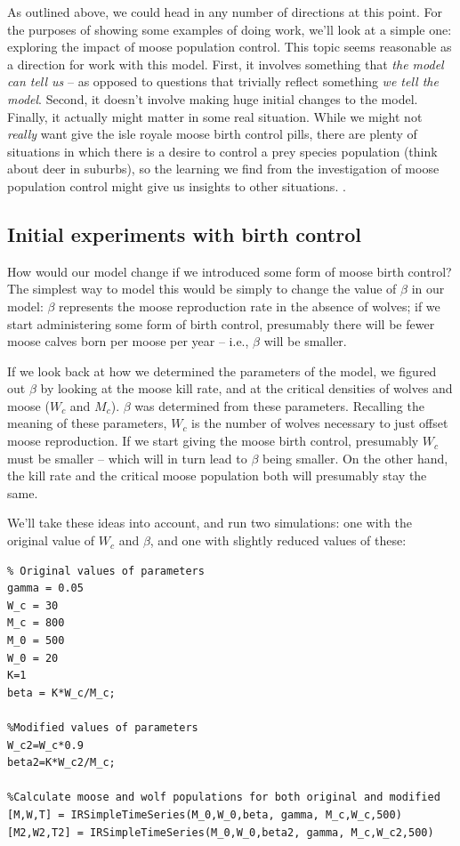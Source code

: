 As outlined above, we could head in any number of directions at this point.  For the purposes of showing some examples of doing work, we'll look at a simple one: exploring the impact of moose population control.
This topic seems reasonable as a direction for work with this model.  First, it  involves something that {\it the model can tell us} -- as opposed to questions that trivially reflect something {\it we tell the model}.  Second, it doesn't involve making huge initial changes to the model.  Finally, it actually might matter in some real situation.  While we might not {\it really} want give the isle royale moose birth control pills, there are plenty of situations in which there is a desire to control a prey species population (think about deer in suburbs), so the learning we find from the investigation of moose population control might give us insights to other situations.  .

\subsection{Initial experiments with birth control}

How would our model change if we introduced some form of moose birth control?  The simplest way to model this would be simply to change the value of $\beta$ in our model:  $\beta$ represents the moose reproduction rate in the absence of wolves; if we start administering some form of birth control, presumably there will be fewer moose calves born per moose per year -- i.e., $\beta$ will be smaller.

If we look back at how we determined the parameters of the model, we figured out $\beta$ by looking at the moose kill rate, and at the critical densities of wolves and moose ($W_c$ and $M_c$).  $\beta$ was determined from these parameters.  Recalling the meaning of these parameters, $W_c$ is the number of wolves necessary to just offset moose reproduction.  If we start giving the moose birth control, presumably $W_c$ must be smaller -- which will in turn lead to $\beta$ being smaller.  On the other hand, the kill rate and the critical moose population both will presumably stay the same.

We'll take these ideas into account, and run two simulations:  one with the original value of $W_c$ and $\beta$, and one with slightly reduced values of these:

\begin{verbatim}
% Original values of parameters
gamma = 0.05
W_c = 30
M_c = 800
M_0 = 500
W_0 = 20
K=1
beta = K*W_c/M_c;

%Modified values of parameters
W_c2=W_c*0.9
beta2=K*W_c2/M_c;

%Calculate moose and wolf populations for both original and modified
[M,W,T] = IRSimpleTimeSeries(M_0,W_0,beta, gamma, M_c,W_c,500)
[M2,W2,T2] = IRSimpleTimeSeries(M_0,W_0,beta2, gamma, M_c,W_c2,500)
\end{verbatim}

